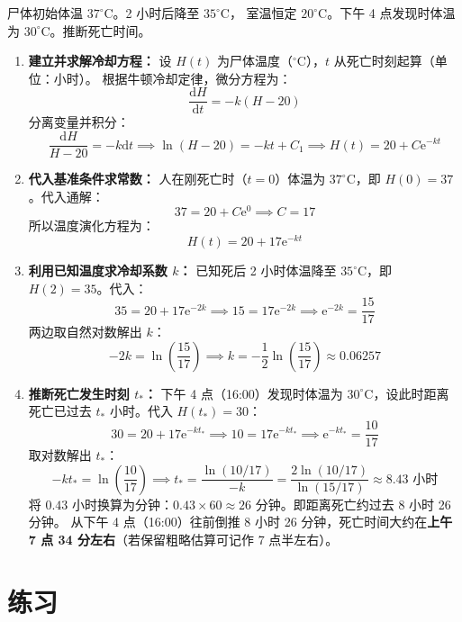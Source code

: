 \documentclass[lang=cn,11pt]{elegantbook}
\begin{document}
\begin{exercise}[法医学中的死亡时间推断] \label{ex:ode-forensic-cooling}
尸体初始体温 $37^\circ\mathrm{C}$。2 小时后降至 $35^\circ\mathrm{C}$，
室温恒定 $20^\circ\mathrm{C}$。下午 4 点发现时体温为 $30^\circ\mathrm{C}$。推断死亡时间。
\end{exercise}
\begin{solution}
\begin{enumerate}
    \item \textbf{建立并求解冷却方程：}
    设 $H(t)$ 为尸体温度（$^\circ\mathrm{C}$），$t$ 从死亡时刻起算（单位：小时）。
    根据牛顿冷却定律，微分方程为：
    \[
    \frac{\mathrm{d}H}{\mathrm{d}t} = -k(H - 20)
    \]
    分离变量并积分：
    \[
    \frac{\mathrm{d}H}{H - 20} = -k\mathrm{d}t \implies \ln(H - 20) = -kt + C_1 \implies H(t) = 20 + C\mathrm{e}^{-kt}
    \]
    \item \textbf{代入基准条件求常数：}
    人在刚死亡时（$t=0$）体温为 $37^\circ\mathrm{C}$，即 $H(0) = 37$。代入通解：
    \[
    37 = 20 + C\mathrm{e}^0 \implies C = 17
    \]
    所以温度演化方程为：
    \[
    H(t) = 20 + 17\mathrm{e}^{-kt}
    \]
    \item \textbf{利用已知温度求冷却系数 $k$：}
    已知死后 2 小时体温降至 $35^\circ\mathrm{C}$，即 $H(2) = 35$。代入：
    \[
    35 = 20 + 17\mathrm{e}^{-2k} \implies 15 = 17\mathrm{e}^{-2k} \implies \mathrm{e}^{-2k} = \frac{15}{17}
    \]
    两边取自然对数解出 $k$：
    \[
    -2k = \ln\left(\frac{15}{17}\right) \implies k = -\frac{1}{2}\ln\left(\frac{15}{17}\right) \approx 0.06257
    \]
    \item \textbf{推断死亡发生时刻 $t_*$：}
    下午 4 点（16:00）发现时体温为 $30^\circ\mathrm{C}$，设此时距离死亡已过去 $t_*$ 小时。代入 $H(t_*) = 30$：
    \[
    30 = 20 + 17\mathrm{e}^{-kt_*} \implies 10 = 17\mathrm{e}^{-kt_*} \implies \mathrm{e}^{-kt_*} = \frac{10}{17}
    \]
    取对数解出 $t_*$：
    \[
    -kt_* = \ln\left(\frac{10}{17}\right) \implies t_* = \frac{\ln(10/17)}{-k} = \frac{2\ln(10/17)}{\ln(15/17)} \approx 8.43 \text{ 小时}
    \]
    将 $0.43$ 小时换算为分钟：$0.43 \times 60 \approx 26$ 分钟。即距离死亡约过去 8 小时 26 分钟。
    从下午 4 点（16:00）往前倒推 8 小时 26 分钟，死亡时间大约在\textbf{上午 7 点 34 分左右}（若保留粗略估算可记作 7 点半左右）。
\end{enumerate}
\end{solution}

\section{练习}
\end{document}
